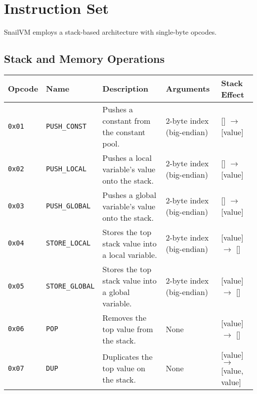 \documentclass[a4paper,12pt]{article}
\begin{document}
    \section{Instruction Set}
    SnailVM employs a stack-based architecture with single-byte opcodes.

    \subsection{Stack and Memory Operations}
    \begin{tabular}{|l|l|p{4cm}|l|l|}
        \hline
        \textbf{Opcode} & \textbf{Name} & \textbf{Description} & \textbf{Arguments} & \textbf{Stack Effect} \\ \hline
        \texttt{0x01} & \texttt{PUSH\_CONST} & Pushes a constant from the constant pool. & 2-byte index (big-endian) & [] $\rightarrow$ [value] \\ \hline
        \texttt{0x02} & \texttt{PUSH\_LOCAL} & Pushes a local variable's value onto the stack. & 2-byte index (big-endian) & [] $\rightarrow$ [value] \\ \hline
        \texttt{0x03} & \texttt{PUSH\_GLOBAL} & Pushes a global variable's value onto the stack. & 2-byte index (big-endian) & [] $\rightarrow$ [value] \\ \hline
        \texttt{0x04} & \texttt{STORE\_LOCAL} & Stores the top stack value into a local variable. & 2-byte index (big-endian) & [value] $\rightarrow$ [] \\ \hline
        \texttt{0x05} & \texttt{STORE\_GLOBAL} & Stores the top stack value into a global variable. & 2-byte index (big-endian) & [value] $\rightarrow$ [] \\ \hline
        \texttt{0x06} & \texttt{POP} & Removes the top value from the stack. & None & [value] $\rightarrow$ [] \\ \hline
        \texttt{0x07} & \texttt{DUP} & Duplicates the top value on the stack. & None & [value] $\rightarrow$ [value, value] \\ \hline

    \end{tabular}
    \label{tab:stack_memory_operations}
\end{document}
